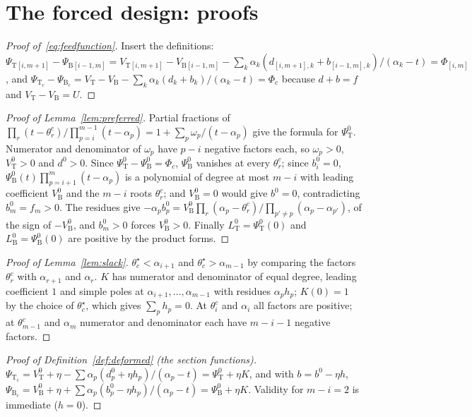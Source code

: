 \documentclass[11pt,a4paper]{report}
\newcommand{\Ts}{\mathrm T}
\newcommand{\Bs}{\mathrm B}
\begin{document}
\section{The forced design: proofs}\label{app:design}

\begin{proof}[Proof of~\eqref{eq:feedfunction}]
Insert the definitions: \(\Psi_{\Ts[i,m+1]}-\Psi_{\Bs[i-1,m]}=V_{\Ts[i,m+1]}-V_{\Bs[i-1,m]}-\sum_k\alpha_k(d_{[i,m+1],k}+b_{[i-1,m],k})/(\alpha_k-t)=\Phi_{[i,m]}\),
and \(\Psi_{\Ts_c}-\Psi_{\Bs_c}=V_\Ts-V_\Bs-\sum_k\alpha_k(d_k+b_k)/(\alpha_k-t)=\Phi_c\) because \(d+b=f\) and \(V_\Ts-V_\Bs=U\).
\end{proof}

\begin{proof}[Proof of Lemma~\ref{lem:preferred}]
Partial fractions of \(\prod_r(t-\theta^c_r)/\prod_{p=i}^{m-1}(t-\alpha_p)=1+\sum_p\omega_p/(t-\alpha_p)\) give the formula for \(\Psi^0_\Ts\).
Numerator and denominator of \(\omega_p\) have \(p-i\) negative factors each, so \(\omega_p>0\), \(V^0_\Ts>0\) and \(d^0>0\). Since
\(\Psi^0_\Ts-\Psi^0_\Bs=\Phi_c\), \(\Psi^0_\Bs\) vanishes at every \(\theta^c_r\); since \(b^0_i=0\), \(\Psi^0_\Bs(t)\prod_{p=i+1}^m(t-\alpha_p)\) is a
polynomial of degree at most \(m-i\) with leading coefficient \(V^0_\Bs\) and the \(m-i\) roots \(\theta^c_r\); and \(V^0_\Bs=0\) would give
\(b^0=0\), contradicting \(b^0_m=f_m>0\). The residues give
\(-\alpha_pb^0_p=V^0_\Bs\prod_r(\alpha_p-\theta^c_r)/\prod_{p'\ne p}(\alpha_p-\alpha_{p'})\), of the sign of \(-V^0_\Bs\), and \(b^0_m>0\) forces
\(V^0_\Bs>0\). Finally \(L^0_\Ts=\Psi^0_\Ts(0)\) and \(L^0_\Bs=\Psi^0_\Bs(0)\) are positive by the product forms.
\end{proof}

\begin{proof}[Proof of Lemma~\ref{lem:slack}]
\(\theta^\star_c<\alpha_{i+1}\) and \(\theta^\star_c>\alpha_{m-1}\) by comparing the factors \(\theta^c_r\) with \(\alpha_{r+1}\) and \(\alpha_r\). \(K\) has
numerator and denominator of equal degree, leading coefficient \(1\) and simple poles at \(\alpha_{i+1},\dots,\alpha_{m-1}\) with residues
\(\alpha_ph_p\); \(K(0)=1\) by the choice of \(\theta^\star_c\), which gives \(\sum_ph_p=0\). At \(\theta^c_i\) and \(\alpha_i\) all factors are
positive; at \(\theta^c_{m-1}\) and \(\alpha_m\) numerator and denominator each have \(m-i-1\) negative factors.
\end{proof}

\begin{proof}[Proof of Definition~\ref{def:deformed} (the section functions)]
\(\Psi_{\Ts_c}=V^0_\Ts+\eta-\sum\alpha_p(d^0_p+\eta h_p)/(\alpha_p-t)=\Psi^0_\Ts+\eta K\), and with \(b=b^0-\eta h\),
\(\Psi_{\Bs_c}=V^0_\Bs+\eta+\sum\alpha_p(b^0_p-\eta h_p)/(\alpha_p-t)=\Psi^0_\Bs+\eta K\). Validity for \(m-i=2\) is immediate (\(h=0\)).
\end{proof}
\end{document}
